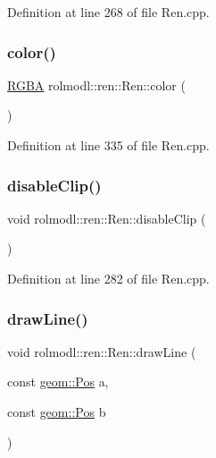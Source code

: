 Definition at line 268 of file Ren.\+cpp.

\mbox{\label{classrolmodl_1_1blend_mode_1_1_ren_a0c5c633cd7adcb0b2a6f108e1afd4528}} 
\subsubsection{\texorpdfstring{color()}{color()}}
{\footnotesize\ttfamily \mbox{\hyperlink{structrolmodl_1_1_r_g_b_a}{R\+G\+BA}} rolmodl\+::ren\+::\+Ren\+::color (\begin{DoxyParamCaption}{ }\end{DoxyParamCaption})}



Definition at line 335 of file Ren.\+cpp.

\mbox{\label{classrolmodl_1_1blend_mode_1_1_ren_a866dcc5c50bf59bce17276defb7801af}} 
\subsubsection{\texorpdfstring{disableClip()}{disableClip()}}
{\footnotesize\ttfamily void rolmodl\+::ren\+::\+Ren\+::disable\+Clip (\begin{DoxyParamCaption}{ }\end{DoxyParamCaption})}



Definition at line 282 of file Ren.\+cpp.

\mbox{\label{classrolmodl_1_1blend_mode_1_1_ren_a4daeaac6e1895a42e8814500a38bbd97}} 
\subsubsection{\texorpdfstring{drawLine()}{drawLine()}}
{\footnotesize\ttfamily void rolmodl\+::ren\+::\+Ren\+::draw\+Line (\begin{DoxyParamCaption}\item[{const \mbox{\hyperlink{structrolmodl_1_1geom_1_1_pos}{geom\+::\+Pos}}}]{a,  }\item[{const \mbox{\hyperlink{structrolmodl_1_1geom_1_1_pos}{geom\+::\+Pos}}}]{b }\end{DoxyParamCaption})}



